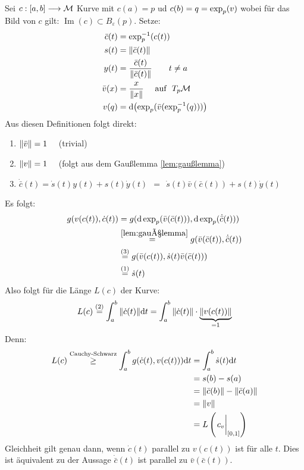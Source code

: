 \begin{bew}
Sei $c:[a, b] \longrightarrow \mathcal{M}$ Kurve mit $c(a)=p$ ud $c(b)=q=\operatorname{exp}_p(v)$ wobei für das Bild von $c$ gilt: $\operatorname{Im}(c) \subset B_{\varepsilon}(p)$. Setze:
\begin{align*}
\bar{c}(t) &= \operatorname{exp}_p^{-1}(c(t)) \\
s(t) &= \norm{\bar{c}(t)} \\
y(t) &= \frac{\bar{c}(t)}{\norm{\bar{c}(t)}} \qquad t \neq a \\
\bar{v}(x)  &= \frac{x}{\norm{x}} \quad \text{ auf} \ \  T_p\mathcal{M} \\
v(q) &= \dd(\operatorname{exp}_p(\bar{v}(\operatorname{exp}_p^{-1}(q))))
\end{align*}
Aus diesen Definitionen folgt direkt:
\begin{enumerate}
\item $\norm{\bar{v}} = 1 \quad$ (trivial)
\item $\norm{v}=1 \quad$ (folgt aus dem Gaußlemma \ref{lem:gaußlemma})
\item $\dot{\bar{c}}(t) = \dot{s}(t)y(t) + s(t)\dot{y}(t) \ \  = \ \ \dot{s}(t)\bar{v}(\bar{c}(t)) + s(t)\dot{y}(t)$
\end{enumerate}
Es folgt:
\begin{align*}
g(v(c(t)),\dot{c}(t)) &= g(\dd\operatorname{exp}_p(\bar{v}(\bar{c}(t))), \dd\operatorname{exp}_p(\dot{\bar{c}}(t)))\\
&\overset{ \ref{lem:gaußlemma}}{\hspace{-5pt}=} g(\bar{v}(\bar{c}(t)),\dot{\bar{c}}(t)) \\
&\overset{(3)}{=} g(\bar{v}(c(t)),\dot{s}(t)\bar{v}(\bar{c}(t))) \\
&\overset{(1)}{=} \dot{s}(t)
\end{align*}
Also folgt für die Länge $L(c)$ der Kurve:
\begin{align}
L(c) \overset{(2)}{=} \int_{a}^{b}\norm{\dot{c}(t)} \dd t = \int_{a}^{b} \norm{\dot{c}(t)}
\cdot \underbrace{\norm{v(c(t))}}_{= 1}
\end{align}
Denn:
\begin{align*}
L(c) \overset{\text{Cauchy-Schwarz}}{\geq} \int_{a}^{b} g(\dot{c}(t),v(c(t))) \dd t &= \int_{a}^{b} \dot{s}(t) \dd t \\ 
&= s(b) - s(a) \\
&= \norm{\bar{c}(b)} -\norm{\bar{c}(a)} \\
&= \norm{v} \\
&= L\left(\eval{c_v}_{[0, 1]}\right)
\end{align*}
Gleichheit gilt genau dann, wenn $\dot{c}(t)$ parallel zu $v(c(t))$ ist für alle $t$. Dies ist äquivalent zu der Aussage $\dot{\bar{c}}(t)$ ist parallel zu $\bar{v}(\bar{c}(t))$. \\

\end{bew}
